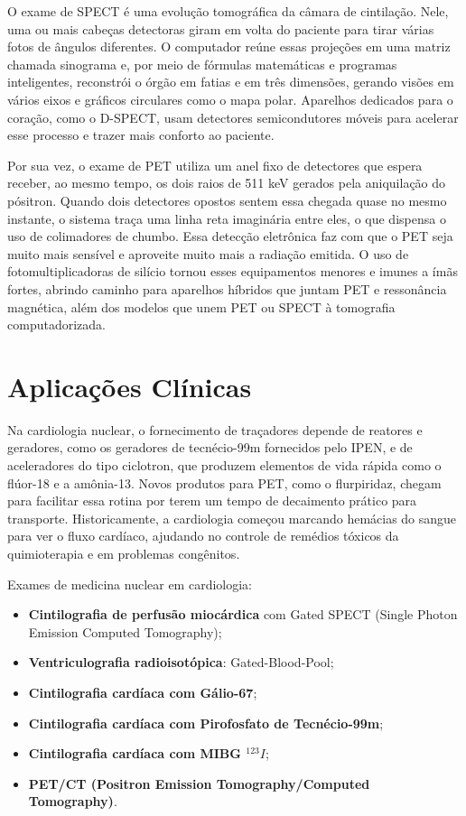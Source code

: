 \documentclass[a4paper,12pt,oneside,openright]{abntex2}
\begin{document}
O exame de SPECT é uma evolução tomográfica da câmara de cintilação. Nele, uma ou mais cabeças detectoras giram em volta do paciente para tirar várias fotos de ângulos diferentes. O computador reúne essas projeções em uma matriz chamada sinograma e, por meio de fórmulas matemáticas e programas inteligentes, reconstrói o órgão em fatias e em três dimensões, gerando visões em vários eixos e gráficos circulares como o mapa polar. Aparelhos dedicados para o coração, como o D-SPECT, usam detectores semicondutores móveis para acelerar esse processo e trazer mais conforto ao paciente.

Por sua vez, o exame de PET utiliza um anel fixo de detectores que espera receber, ao mesmo tempo, os dois raios de 511 keV gerados pela aniquilação do pósitron. Quando dois detectores opostos sentem essa chegada quase no mesmo instante, o sistema traça uma linha reta imaginária entre eles, o que dispensa o uso de colimadores de chumbo. Essa detecção eletrônica faz com que o PET seja muito mais sensível e aproveite muito mais a radiação emitida. O uso de fotomultiplicadoras de silício tornou esses equipamentos menores e imunes a ímãs fortes, abrindo caminho para aparelhos híbridos que juntam PET e ressonância magnética, além dos modelos que unem PET ou SPECT à tomografia computadorizada.


\section{Aplicações Clínicas}

Na cardiologia nuclear, o fornecimento de traçadores depende de reatores e geradores, como os geradores de tecnécio-99m fornecidos pelo IPEN, e de aceleradores do tipo ciclotron, que produzem elementos de vida rápida como o flúor-18 e a amônia-13. Novos produtos para PET, como o flurpiridaz, chegam para facilitar essa rotina por terem um tempo de decaimento prático para transporte. Historicamente, a cardiologia começou marcando hemácias do sangue para ver o fluxo cardíaco, ajudando no controle de remédios tóxicos da quimioterapia e em problemas congênitos.

Exames de medicina nuclear em cardiologia:
\begin{itemize}{\setlength{\leftmargin}{1.5cm}}
  \item \textbf{Cintilografia de perfusão miocárdica} com Gated SPECT (Single Photon Emission Computed Tomography);
  \item \textbf{Ventriculografia radioisotópica}: Gated-Blood-Pool;
  \item \textbf{Cintilografia cardíaca com Gálio-67};
  \item \textbf{Cintilografia cardíaca com Pirofosfato de Tecnécio-99m};
  \item \textbf{Cintilografia cardíaca com MIBG $^{123}I$};
  \item \textbf{PET/CT (Positron Emission Tomography/Computed Tomography)}.
\end{itemize}
\end{document}
